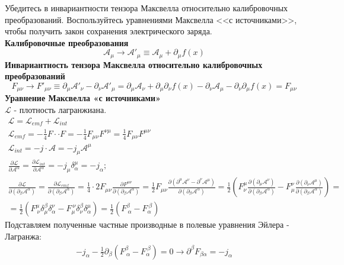 \documentclass[__main__.tex]{subfiles}
\begin{document}
Убедитесь в инвариантности тензора Максвелла относительно калибровочных преобразований. Воспользуйтесь уравнениями Максвелла <<с источниками>>, чтобы получить закон сохранения электрического заряда.\\ 

\textbf{Калибровочные преобразования}\\
$$\mathcal A_\mu \longrightarrow \mathcal A'_\mu \equiv \mathcal A_\mu +\partial_\mu f(x)$$
\textbf{Инвариантность тензора Максвелла относительно калибровочных преобразований}\\
$$F_{\mu\nu} \longrightarrow F'_{\mu\nu} \equiv \partial_\mu \mathcal A'_\nu - \partial_\nu \mathcal A'_\mu = \partial_\mu \mathcal A_\nu + \partial_\mu \partial_\nu f(x) - \partial_\nu \mathcal A_\mu - \partial_\nu\partial_\mu f(x) = F_{\mu\nu}$$
\textbf{Уравнение Максвелла «с источниками»}\\
$\mathcal L$ - плотность лагранжиана. 
\begin{gather*}
\mathcal L = \mathcal L_{emf} + \mathcal L_{int}\\
\mathcal L_{emf} = -\frac{1}{4} F \cdot\cdot F = -\frac{1}{4}F_{\mu \nu}F^{\nu\mu} = \frac{1}{4}F_{\mu\nu}F^{\mu\nu}\\
\mathcal L_{int} = -j \cdot \mathcal A = -j_\mu \mathcal A^\mu\\
\frac{\partial\mathcal L}{\partial \mathcal A^\alpha} = \frac{\partial\mathcal L_{int}}{\partial \mathcal A^\alpha} = -j_\mu \delta_\alpha^\mu = -j_\alpha;\\
\frac{\partial \mathcal L}{\partial(\partial_\beta \mathcal A^\alpha)} = \frac{\partial \mathcal L_{emf}}{\partial(\partial_\beta\mathcal A^\alpha)} = \frac{1}{4} \cdot 2F_{\mu\nu}\frac{\partial F^{\mu \nu}}{\partial(\partial_\beta \mathcal A^\alpha)} = \frac{1}{2}F_{\mu\nu}\frac{\partial(\partial^\mu\mathcal A^\nu - \partial^\nu \mathcal A^\mu)}{\partial(\partial_\beta \mathcal A^\alpha)} = \frac{1}{2}\left(F^\mu_\nu\frac{\partial(\partial_\mu\mathcal A^\nu)}{\partial(\partial_\beta \mathcal A^\alpha)} - F^\nu_\mu\frac{\partial(\partial_\nu\mathcal A^\mu)}{\partial(\partial_\beta \mathcal A^\alpha)}\right) =\\ =  \frac{1}{2} \left( F^\mu_{\ \nu} \delta^\beta_\mu \delta^\nu_\alpha - F^{\ \nu}_\mu \delta^\beta_\nu \delta^\mu_\alpha \right) = \frac{1}{2} \left(F^\beta_{\ \alpha} - F^{\ \beta}_\alpha\right)
\end{gather*}
Подставляем полученные частные производные в полевые уравнения Эйлера - Лагранжа:
\begin{gather*}
-j_\alpha - \frac{1}{2} \partial_\beta\left(F^\beta_{\ \alpha} - F_\alpha^{\ \beta}\right) = 0 \rightarrow \partial^\beta F_{\beta\alpha} = -j_\alpha
\end{gather*}
\end{document}
